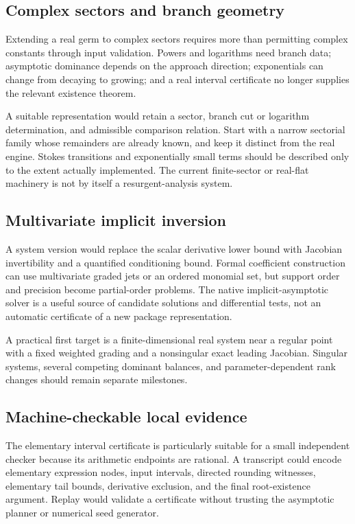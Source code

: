 \documentclass[11pt,a4paper]{article}
\begin{document}
\subsection{Complex sectors and branch geometry}
Extending a real germ to complex sectors requires more than permitting
complex constants through input validation. Powers and logarithms need
branch data; asymptotic dominance depends on the approach direction;
exponentials can change from decaying to growing; and a real interval
certificate no longer supplies the relevant existence theorem.

A suitable representation would retain a sector, branch cut or logarithm
determination, and admissible comparison relation. Start with a narrow
sectorial family whose remainders are already known, and keep it distinct
from the real engine. Stokes transitions and exponentially small terms
should be described only to the extent actually implemented. The current
finite-sector or real-flat machinery is not by itself a resurgent-analysis
system.

\subsection{Multivariate implicit inversion}
A system version would replace the scalar derivative lower bound with
Jacobian invertibility and a quantified conditioning bound. Formal
coefficient construction can use multivariate graded jets or an ordered
monomial set, but support order and precision become partial-order problems.
The native implicit-asymptotic solver is a useful source of candidate
solutions and differential tests, not an automatic certificate of a new
package representation.
\cite{asymptoticsolve}

A practical first target is a finite-dimensional real system near a regular
point with a fixed weighted grading and a nonsingular exact leading
Jacobian. Singular systems, several competing dominant balances, and
parameter-dependent rank changes should remain separate milestones.

\subsection{Machine-checkable local evidence}
The elementary interval certificate is particularly suitable for a small
independent checker because its arithmetic endpoints are rational. A
transcript could encode elementary expression nodes, input intervals,
directed rounding witnesses, elementary tail bounds, derivative exclusion,
and the final root-existence argument. Replay would validate a certificate
without trusting the asymptotic planner or numerical seed generator.
\end{document}
